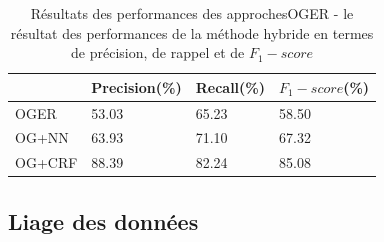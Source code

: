 \begin{center}
\begin{table}[h]
\begin{tabular}{ |p{2.5cm}|p{3 cm}| p{3 cm}|p{3 cm}|} 
\hline
 &Precision(\%)&Recall(\%)&$F_{1}-score$(\%)\\
 \hline
OGER&53.03&65.23&58.50\\ 
\hline
OG+NN& 63.93&71.10 &67.32 \\
\hline
OG+CRF & 88.39&82.24&85.08\\
\hline
\end{tabular}
\newline
\label{resultat2}
\caption[Résultats des performances des approches OGER]{Résultats des performances des approchesOGER - le résultat des performances de la méthode hybride en termes de précision, de rappel et de $F_{1}-score$}
\end{table}
\end{center}

\subsection{Liage des données}
\label{interrogation}

